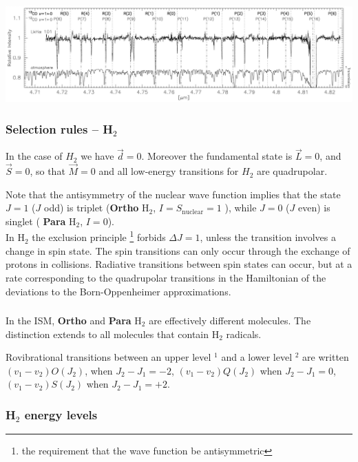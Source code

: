 \begin{frame}
\begin{center}
\includegraphics[width=\textwidth,height=!]{./B/CO_subaru_2.jpg}
\end{center}
\vfill



\end{frame} \begin{frame}\frametitle{Selection rules -- H$_2$}

In the case of $H_2$ we have $\vec{d}=0$. Moreover the fundamental
 state is $\vec{L} = 0$, and $\vec{S}=0$, so that $\vec{M}=0$ and all
 low-energy transitions for  $H_2$ are quadrupolar.

Note that the antisymmetry of the nuclear wave function implies that
the state $J=1$ ($J$ odd) is triplet ({\bf Ortho } H$_2$, $I =
S_\mathrm{nuclear} = 1$ ), while $J=0$ ($J$ even) is singlet ({\bf
Para } H$_2$, $I = 0$).\\


In H$_2$ the exclusion principle \footnote{the requirement that the
  wave function be antisymmetric} forbids $\Delta J = 1$, unless the
transition involves a change in spin state. The spin transitions can
only occur through the exchange of protons in collisions. Radiative
transitions between spin states can occur, but at a rate corresponding
to the quadrupolar transitions in the Hamiltonian of the deviations to
the Born-Oppenheimer approximations. \\


\end{frame} \begin{frame}\frametitle{}

In the ISM, {\bf Ortho } and {\bf Para } H$_2$ are effectively
different molecules. The distinction extends to all molecules that
contain H$_2$ radicals.

Rovibrational transitions between an upper level $^1$ and a lower
level $^2$ are written $(v_1-v_2)O(J_2)$, when $J_2-J_1 = -2$,
$(v_1-v_2)Q(J_2)$ when $J_2-J_1 = 0$, $(v_1-v_2)S(J_2)$ when $J_2-J_1
= +2$.



\end{frame} \begin{frame}\frametitle{H$_2$ energy levels}


\end{frame}
